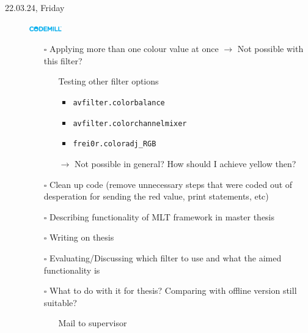 \documentclass[a4, 11pt]{scrartcl}
\newcommand{\cmark}{\ding{51}}%
\newcommand{\done}{\rlap{$\square$}{\raisebox{2pt}{\large\hspace{1pt}\cmark}}%
	\hspace{-2.5pt}}
\begin{document}
\begin{description}
	
	
	
	
	
	
	


\item[22.03.24, Friday]
\includegraphics[width=1.4cm]{codemill.png}
\begin{itemize}

	
		\item[$\square$] Applying more than one colour value at once $\rightarrow$ Not possible with this filter?
		\begin{itemize}
			\item[\done] Testing other filter options
				\begin{itemize}
					\item \texttt{avfilter.colorbalance}
					\item \texttt{avfilter.colorchannelmixer}
					\item \texttt{frei0r.coloradj\_RGB}
				\end{itemize}
		$\rightarrow$ Not possible in general? How should I achieve yellow then?
		\end{itemize}	
		
			
		\item[$\square$] Clean up code (remove unnecessary steps that were coded out of desperation for sending the red value, print statements, etc)

		\item[$\square$] Describing functionality of MLT framework in master thesis
		
		\item[$\square$] Writing on thesis
		
		\item[$\square$] Evaluating/Discussing which filter to use and what the aimed functionality is
		
		\item[$\square$] What to do with it for thesis? Comparing with offline version still suitable?
		
		\begin{itemize}
			\item[\done] Mail to supervisor
		\end{itemize}
	
\end{itemize}	
	

\end{description}
\end{document}
